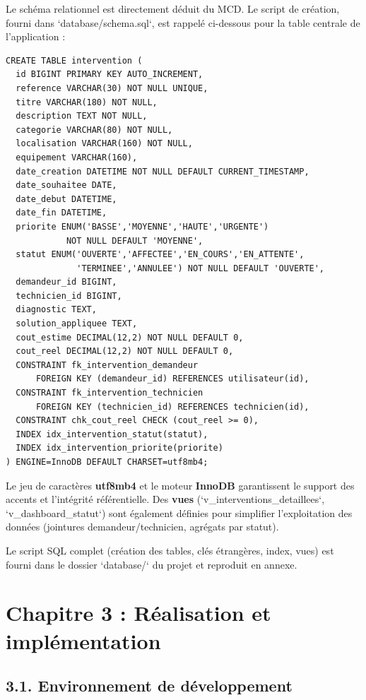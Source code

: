 \documentclass[11pt,a4paper]{report}
\begin{document}
Le schéma relationnel est directement déduit du MCD. Le script de création, fourni dans `database/schema.sql`, est rappelé ci-dessous pour la table centrale de l'application :
\begin{lstlisting}
CREATE TABLE intervention (
  id BIGINT PRIMARY KEY AUTO_INCREMENT,
  reference VARCHAR(30) NOT NULL UNIQUE,
  titre VARCHAR(180) NOT NULL,
  description TEXT NOT NULL,
  categorie VARCHAR(80) NOT NULL,
  localisation VARCHAR(160) NOT NULL,
  equipement VARCHAR(160),
  date_creation DATETIME NOT NULL DEFAULT CURRENT_TIMESTAMP,
  date_souhaitee DATE,
  date_debut DATETIME,
  date_fin DATETIME,
  priorite ENUM('BASSE','MOYENNE','HAUTE','URGENTE')
            NOT NULL DEFAULT 'MOYENNE',
  statut ENUM('OUVERTE','AFFECTEE','EN_COURS','EN_ATTENTE',
              'TERMINEE','ANNULEE') NOT NULL DEFAULT 'OUVERTE',
  demandeur_id BIGINT,
  technicien_id BIGINT,
  diagnostic TEXT,
  solution_appliquee TEXT,
  cout_estime DECIMAL(12,2) NOT NULL DEFAULT 0,
  cout_reel DECIMAL(12,2) NOT NULL DEFAULT 0,
  CONSTRAINT fk_intervention_demandeur
      FOREIGN KEY (demandeur_id) REFERENCES utilisateur(id),
  CONSTRAINT fk_intervention_technicien
      FOREIGN KEY (technicien_id) REFERENCES technicien(id),
  CONSTRAINT chk_cout_reel CHECK (cout_reel >= 0),
  INDEX idx_intervention_statut(statut),
  INDEX idx_intervention_priorite(priorite)
) ENGINE=InnoDB DEFAULT CHARSET=utf8mb4;
\end{lstlisting}

Le jeu de caractères \textbf{utf8mb4} et le moteur \textbf{InnoDB} garantissent le support des accents et l'intégrité référentielle. Des \textbf{vues} (`v\_interventions\_detaillees`, `v\_dashboard\_statut`) sont également définies pour simplifier l'exploitation des données (jointures demandeur/technicien, agrégats par statut).

Le script SQL complet (création des tables, clés étrangères, index, vues) est fourni dans le dossier `database/` du projet et reproduit en annexe.
\chapter*{Chapitre 3 : Réalisation et implémentation}
\section*{3.1. Environnement de développement}
\end{document}
